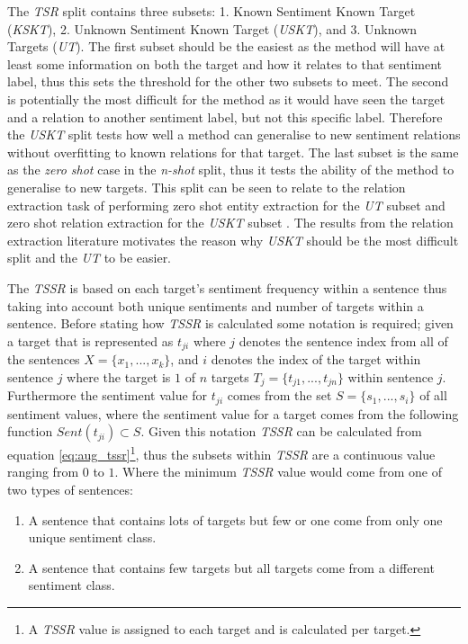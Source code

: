 The \textit{TSR} split contains three subsets: 1. Known Sentiment Known Target (\textit{KSKT}), 2. Unknown Sentiment Known Target (\textit{USKT}), and 3. Unknown Targets (\textit{UT}). The first subset should be the easiest as the method will have at least some information on both the target and how it relates to that sentiment label, thus this sets the threshold for the other two subsets to meet. The second is potentially the most difficult for the method as it would have seen the target and a relation to another sentiment label, but not this specific label. Therefore the \textit{USKT} split tests how well a method can generalise to new sentiment relations without overfitting to known relations for that target. The last subset is the same as the \textit{zero shot} case in the \textit{n-shot} split, thus it tests the ability of the method to generalise to new targets. This split can be seen to relate to the relation extraction task of performing zero shot entity extraction for the \textit{UT} subset and zero shot relation extraction for the \textit{USKT} subset \citep{levy-etal-2017-zero}. The results from the relation extraction literature \citep{levy-etal-2017-zero,abdou-etal-2019-x} motivates the reason why \textit{USKT} should be the most difficult split and the \textit{UT} to be easier.

The \textit{TSSR} is based on each target's sentiment frequency within a sentence thus taking into account both unique sentiments and number of targets within a sentence. Before stating how \textit{TSSR} is calculated some notation is required; given a target that is represented as $t_{ji}$ where $j$ denotes the sentence index from all of the sentences $X=\{x_1,...,x_k\}$, and $i$ denotes the index of the target within sentence $j$ where the target is $1$ of $n$ targets $T_j=\{t_{j1},...,t_{jn}\}$ within sentence $j$. Furthermore the sentiment value for $t_{ji}$ comes from the set $S=\{s_1,...,s_i\}$ of all sentiment values, where the sentiment value for a target comes from the following function $Sent(t_{ji})\subset S$. Given this notation \textit{TSSR} can be calculated from equation \ref{eq:aug_tssr}\footnote{A \textit{TSSR} value is assigned to each target and is calculated per target.}, thus the subsets within \textit{TSSR} are a continuous value ranging from $0$ to $1$. Where the minimum \textit{TSSR} value would come from one of two types of sentences:
\begin{enumerate}
    \item A sentence that contains lots of targets but few or one come from only one unique sentiment class.
    \item A sentence that contains few targets but all targets come from a different sentiment class.
\end{enumerate}

